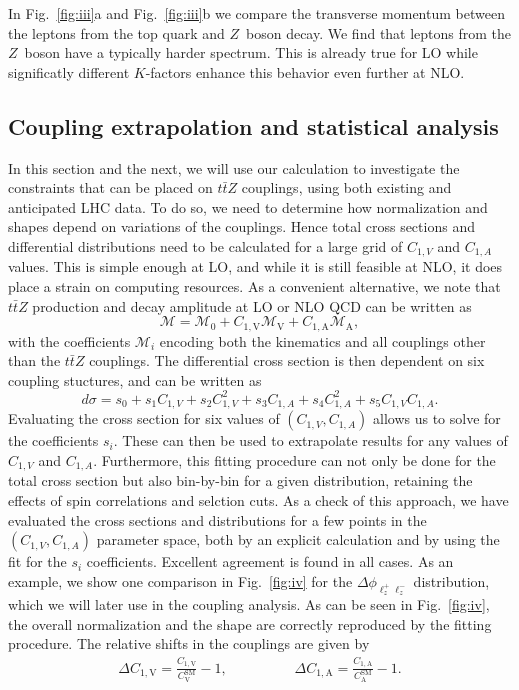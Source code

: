 \documentclass[preprint]{JHEP3}
\newcommand{\mrm}{\mathrm}
\def\ttbZ{t\bar{t}Z}
\def\ConeA{C_{1,\mathrm{A}}}
\def\ConeV{C_{1,\mathrm{V}}}
\def\ConeVSM{C_\mathrm{V}^{\mrm{SM}}}
\def\ConeASM{C_\mathrm{A}^{\mrm{SM}}}
\def\DConeA{\Delta C_{1,\mathrm{A}}}
\def\DConeV{\Delta C_{1,\mathrm{V}}}
\newcommand{\be}{\begin{eqnarray}}
\newcommand{\ee}{\end{eqnarray}}
\begin{document}
In Fig.~\ref{fig:iii}a and Fig.~\ref{fig:iii}b we compare the transverse momentum between the leptons from the top quark and $Z$~boson decay.
We find that leptons from the $Z$~boson have a typically harder spectrum. 
This is already true for LO while significatly different $K$-factors enhance this behavior even further at NLO.





\subsection{Coupling extrapolation and statistical analysis}
\label{sect:analysis}

In this section and the next, we will use our calculation to investigate the constraints that can be placed on $\ttbZ$ couplings, 
using both existing and anticipated LHC data. 
To do so, we need to determine how normalization and shapes depend on variations of the couplings. 
Hence total cross sections and differential distributions need to be calculated for a large grid of $C_{1,V}$ and $C_{1,A}$ values. 
This is simple enough at LO, and while it is still feasible at NLO, it does place a strain on computing resources. 
As a convenient alternative, we note that $\ttbZ$ production and decay amplitude at LO or NLO QCD can be written as
\begin{equation}
  \mathcal{M} = \mathcal{M}_0 +  \ConeV \mathcal{M}_\mathrm{V} +  \ConeA \mathcal{M}_\mathrm{A},
\end{equation}
with the coefficients $\mathcal{M}_i$ encoding both the kinematics and all couplings other than the $\ttbZ$ couplings. 
The differential cross section is then dependent on six coupling stuctures, and can be written as
\begin{equation}
\label{couplfit}
  d\sigma = s_0 +s_1C_{1,V} + s_2C_{1,V}^2 +s_3 C_{1,A}+s_4C_{1,A}^2+s_5C_{1,V}C_{1,A}.
\end{equation}
Evaluating the cross section for six values of $(C_{1,V},C_{1,A})$ allows us to solve for the coefficients $s_i$. 
These can then be used to extrapolate results for any values of $C_{1,V}$ and $C_{1,A}$. 
Furthermore, this fitting procedure can not only be done for the total cross section but also bin-by-bin for a given distribution, 
retaining the effects of spin correlations and selction cuts.
As a check of this approach, we have evaluated the cross sections and distributions for a few points in the $(C_{1,V},C_{1,A})$ parameter space, 
both by an explicit calculation and by using the fit for the $s_i$ coefficients. Excellent agreement is found in all cases. 
As an example, we show one comparison in Fig.~\ref{fig:iv} for the  $\Delta \phi_{\ell^+_z \ell^-_z}$ distribution, which we will later use in the coupling analysis.
As can be seen in Fig.~\ref{fig:iv}, the overall normalization and the shape are correctly reproduced by the fitting procedure.
The relative shifts in the couplings are given by
\be
  \DConeV =  \frac{\ConeV}{\ConeVSM}-1,
  \hspace{2cm} 
  \DConeA = \frac{\ConeA}{\ConeASM}-1.
\ee
\end{document}
